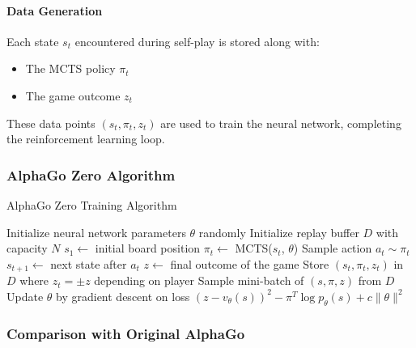 \documentclass[11pt]{article}
\begin{document}
\paragraph{Data Generation}
Each state $s_t$ encountered during self-play is stored along with:
\begin{itemize}
    \item The MCTS policy $\pi_t$
    \item The game outcome $z_t$
\end{itemize}

These data points $(s_t, \pi_t, z_t)$ are used to train the neural network, completing the reinforcement learning loop.

\subsubsection{AlphaGo Zero Algorithm}

\begin{algorithm}
\caption{AlphaGo Zero Training Algorithm}
\begin{algorithmic}[1]
\State Initialize neural network parameters $\theta$ randomly
\State Initialize replay buffer $D$ with capacity $N$
        \State $s_1 \gets$ initial board position
            \State $\pi_t \gets$ MCTS($s_t$, $\theta$) 
            \State Sample action $a_t \sim \pi_t$ 
            \State $s_{t+1} \gets$ next state after $a_t$
        \EndFor
        \State $z \gets$ final outcome of the game
            \State Store $(s_t, \pi_t, z_t)$ in $D$ where $z_t = \pm z$ depending on player
        \EndFor
    \EndFor
    \State Sample mini-batch of $(s, \pi, z)$ from $D$
    \State Update $\theta$ by gradient descent on loss $(z - v_\theta(s))^2 - \pi^T \log p_\theta(s) + c\|\theta\|^2$
\EndFor
\end{algorithmic}
\end{algorithm}

\subsubsection{Comparison with Original AlphaGo}
\end{document}
